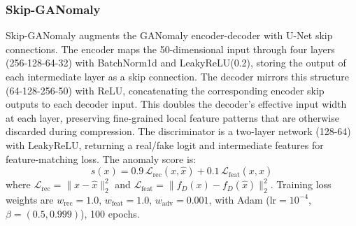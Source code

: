 \documentclass[conference]{IEEEtran}
\begin{document}
\subsubsection{Skip-GANomaly}

Skip-GANomaly augments the GANomaly encoder-decoder with U-Net skip
connections. The encoder maps the 50-dimensional input through four layers
(256-128-64-32) with BatchNorm1d and LeakyReLU(0.2), storing the output of
each intermediate layer as a skip connection. The decoder mirrors this
structure (64-128-256-50) with ReLU, concatenating the corresponding encoder
skip outputs to each decoder input. This doubles the decoder's effective
input width at each layer, preserving fine-grained local feature patterns
that are otherwise discarded during compression. The discriminator is a
two-layer network (128-64) with LeakyReLU, returning a real/fake logit and
intermediate features for feature-matching loss. The anomaly score is:
\begin{equation}
s(x) = 0.9\,\mathcal{L}_\text{rec}(x, \hat{x}) + 0.1\,\mathcal{L}_\text{feat}(x, \hat{x})
\end{equation}
where $\mathcal{L}_\text{rec} = \|x - \hat{x}\|_2^2$ and
$\mathcal{L}_\text{feat} = \|f_D(x) - f_D(\hat{x})\|_2^2$. Training loss
weights are $w_\text{rec}=1.0$, $w_\text{feat}=1.0$, $w_\text{adv}=0.001$,
with Adam ($\text{lr}=10^{-4}$, $\beta=(0.5, 0.999)$), 100 epochs.
\end{document}
